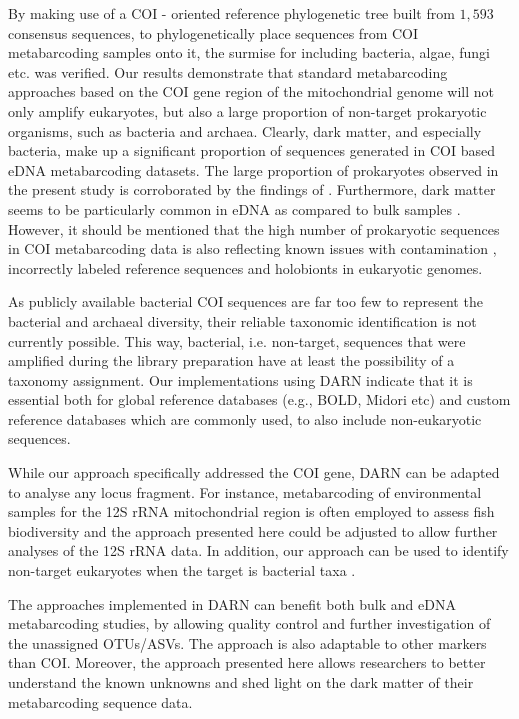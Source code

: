    By making use of a COI - oriented reference phylogenetic tree built from $1,593$ consensus sequences, to phylogenetically place sequences from COI metabarcoding samples onto it, the surmise for including bacteria, algae, fungi etc. \citep{yang2013testing, aylagas2016benchmarking} was verified. 
   Our results demonstrate that standard metabarcoding approaches based on the COI gene region of the mitochondrial genome will not only amplify eukaryotes, but also a large proportion of non-target prokaryotic organisms, such as bacteria and archaea. 
   Clearly, dark matter, and especially bacteria, make up a significant proportion of sequences generated in COI based eDNA metabarcoding datasets. 
   The large proportion of prokaryotes observed in the present study is corroborated by the findings of \citep{yang2013testing}. 
   Furthermore, dark matter seems to be particularly common in eDNA as compared to bulk samples \citep{andujar2018coi}. 
   However, it should be mentioned that the high number of prokaryotic sequences in COI metabarcoding data is also reflecting known issues with contamination 
   \citep{kumar2013blobology, dittami2017detection, de2020contaminations}, 
   incorrectly labeled reference sequences \citep{steinegger2020terminating} and holobionts 
   \citep{gilbert2012symbiotic, salvucci2016microbiome} in eukaryotic genomes.

   As publicly available bacterial COI sequences are far too few to represent the bacterial and archaeal diversity, their reliable taxonomic identification is not currently possible. 
   This way, bacterial, i.e. non-target, sequences that were amplified during the library preparation have at least the possibility of a taxonomy assignment. 
   Our implementations using DARN indicate that it is essential both for global reference databases (e.g., BOLD, Midori etc) and custom reference databases which are commonly used, to also include non-eukaryotic sequences.

   While our approach specifically addressed the COI gene, DARN can be adapted to analyse any locus fragment. 
   For instance, metabarcoding of environmental samples for the 12S rRNA mitochondrial region is often employed to assess fish biodiversity \citep{weigand2019dna, miya2020mifish} and the approach presented here could be adjusted to allow further analyses of the 12S rRNA data. 
   In addition, our approach can be used to identify non-target eukaryotes when the target is bacterial taxa \citep{huys2008coamplification}.

   The approaches implemented in DARN can benefit both bulk and eDNA metabarcoding studies, by allowing quality control and further investigation of the unassigned OTUs/ASVs. 
   The approach is also adaptable to other markers than COI. Moreover, the approach presented here allows researchers to better understand the known unknowns and shed light on the dark matter of their metabarcoding sequence data.



